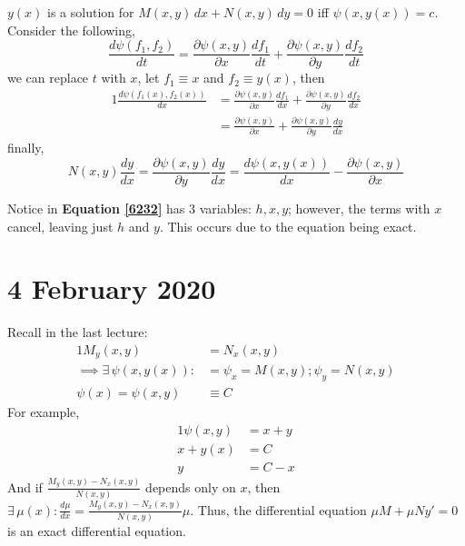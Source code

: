 \documentclass[twoside]{report}
\begin{document}
    \begin{remark}
        $y(x)$ is a solution for $M(x, y)\,dx + N(x, y)\,dy = 0$ iff $\psi(x, y(x)) = c$.
        Consider the following,
        \[
            \frac{d\psi(f_{1}, f_{2})}{dt} = \frac{\partial \psi(x, y)}{\partial x}\frac{df_{1}}{dt} + \frac{\partial \psi(x, y)}{\partial y}\frac{df_{2}}{dt}
        \]
        we can replace $t$ with $x$, let $f_{1} \equiv x$ and $f_{2} \equiv y(x)$, then
        \begin{alignat}{1}
            \frac{d\psi(f_{1}(x), f_{2}(x))}{dx} &= \frac{\partial \psi(x, y)}{\partial x}\frac{df_{1}}{dx} + \frac{\partial \psi(x, y)}{\partial y}\frac{df_{2}}{dx}\\
            &= \frac{\partial \psi(x, y)}{\partial x} + \frac{\partial \psi(x, y)}{\partial y}\frac{dy}{dx}
        \end{alignat}
        finally,
        \[
            N(x, y)\frac{dy}{dx} = \frac{\partial \psi(x, y)}{\partial y} \frac{dy}{dx} = \frac{d\psi(x, y(x))}{dx} - \frac{\partial \psi(x, y)}{\partial x}
        \]
    \end{remark}
    \begin{remark}
        Notice in \textbf{Equation \ref{6232}} has 3 variables: $h, x, y$; however, the terms with $x$ cancel, leaving just $h$ and $y$. This occurs due to the equation being exact.
    \end{remark}
    \chapter{4 February 2020}
    Recall in the last lecture:
    \begin{alignat}{1}
        M_{y}(x, y) &= N_{x}(x, y)\\
        \implies \exists\,\psi(x, y(x)):&= \psi_{x}=M(x,y); \psi_{y}=N(x, y)\\
        \psi(x) = \psi(x, y) &\equiv C
    \end{alignat}
    For example,
    \begin{alignat}{1}
        \psi(x, y) &= x + y\\
        x + y(x) &= C\\
        y &= C - x
    \end{alignat}
    And if $\frac{M_{y}(x, y) - N_{x}(x, y)}{N(x, y)}$ depends only on $x$, then $\exists\,\mu(x): \frac{d\mu}{dx} = \frac{M_{y}(x, y) - N_{x}(x, y)}{N(x, y)}\mu$. Thus, the differential equation $\mu M + \mu Ny' = 0$ is an exact differential equation.
\end{document}
